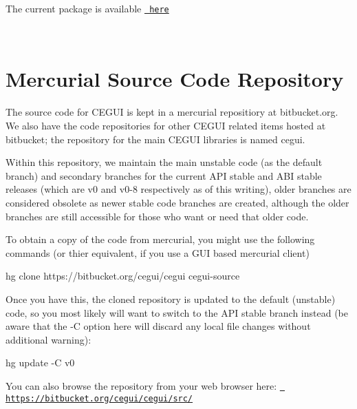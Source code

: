 The current package is available \href{https://bitbucket.org/cegui/cegui-dependencies/get/v0-8.zip}{\texttt{ here}}

~\newline
 \hypertarget{downloading_dl_hg}{}\section{Mercurial Source Code Repository}\label{downloading_dl_hg}
The source code for C\+E\+G\+UI is kept in a mercurial repositiory at bitbucket.\+org. We also have the code repositories for other C\+E\+G\+UI related items hosted at bitbucket; the repository for the main C\+E\+G\+UI libraries is named \textquotesingle{}cegui\textquotesingle{}.

Within this repository, we maintain the main unstable code (as the default branch) and secondary branches for the current A\+PI stable and A\+BI stable releases (which are v0 and v0-\/8 respectively as of this writing), older branches are considered obsolete as newer stable code branches are created, although the older branches are still accessible for those who want or need that older code.

To obtain a copy of the code from mercurial, you might use the following commands (or thier equivalent, if you use a G\+UI based mercurial client) \begin{DoxyVerb}hg clone https://bitbucket.org/cegui/cegui cegui-source
\end{DoxyVerb}


Once you have this, the cloned repository is updated to the default (unstable) code, so you most likely will want to switch to the A\+PI stable branch instead (be aware that the -\/C option here will discard any local file changes without additional warning)\+: \begin{DoxyVerb}hg update -C v0
\end{DoxyVerb}


You can also browse the repository from your web browser here\+: \href{https://bitbucket.org/cegui/cegui/src/}{\texttt{ https\+://bitbucket.\+org/cegui/cegui/src/}} 